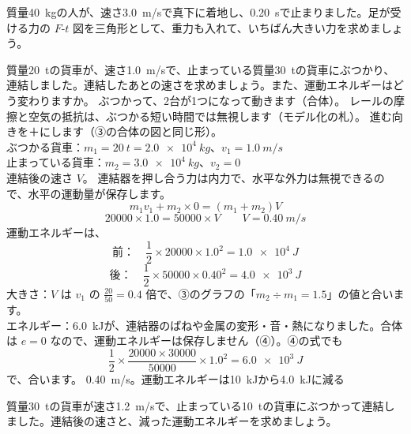 \begin{jibun}
質量\qty{40}{kg}の人が、速さ\qty{3.0}{m/s}で真下に着地し、\qty{0.20}{s}で止まりました。足が受ける力の $F$-$t$ 図を三角形として、重力も入れて、いちばん大きい力を求めましょう。
\end{jibun}

\label{ph:力-3:ex4}
\begin{phreidai}[貨車をつなぐ]
質量\qty{20}{t}の貨車が、速さ\qty{1.0}{m/s}で、止まっている質量\qty{30}{t}の貨車にぶつかり、連結しました。連結したあとの速さを求めましょう。また、運動エネルギーはどう変わりますか。
\phbamen
ぶつかって、2台が1つになって動きます（合体）。
\phmushi
レールの摩擦と空気の抵抗は、ぶつかる短い時間では無視します（モデル化の札）。
\phzu
進む向きを＋にします（③の合体の図と同じ形）。\\ぶつかる貨車：$m_1=\qty{20}{t}=\qty{2.0e4}{kg}$、$v_1=\qty{1.0}{m/s}$\\止まっている貨車：$m_2=\qty{3.0e4}{kg}$、$v_2=0$\\連結後の速さ $V$。
\phriyu
連結器を押し合う力は内力で、水平な外力は無視できるので、水平の運動量が保存します。
\phtateru
\[m_1v_1+m_2\times0=(m_1+m_2)V\]
\phtoku
\[\num{20000}\times1.0=\num{50000}\times V\qquad V=\qty{0.40}{m/s}\]
運動エネルギーは、
\[\text{前：}\quad\frac{1}{2}\times\num{20000}\times1.0^2=\qty{1.0e4}{J}\]
\[\text{後：}\quad\frac{1}{2}\times\num{50000}\times0.40^2=\qty{4.0e3}{J}\]
\phtashikame
大きさ：$V$ は $v_1$ の $\tfrac{20}{50}=0.4$ 倍で、③のグラフの「$m_2\div m_1=1.5$」の値と合います。\\
エネルギー：\qty{6.0}{kJ}が、連結器のばねや金属の変形・音・熱になりました。合体は $e=0$ なので、運動エネルギーは保存しません（④）。④の式でも
\[\frac{1}{2}\times\frac{\num{20000}\times\num{30000}}{\num{50000}}\times1.0^2=\qty{6.0e3}{J}\]
で、合います。
\kotae \qty{0.40}{m/s}。運動エネルギーは\qty{10}{kJ}から\qty{4.0}{kJ}に減る
\end{phreidai}
\begin{jibun}
質量\qty{30}{t}の貨車が速さ\qty{1.2}{m/s}で、止まっている\qty{10}{t}の貨車にぶつかって連結しました。連結後の速さと、減った運動エネルギーを求めましょう。
\end{jibun}

